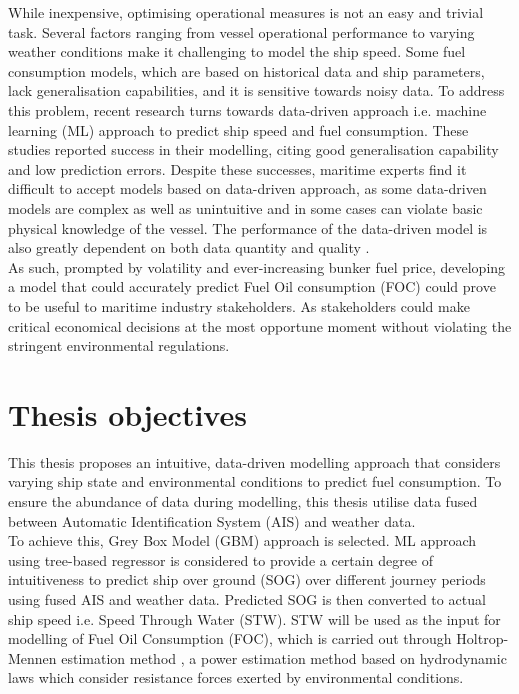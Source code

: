 While inexpensive, optimising operational measures is not an easy and trivial task. Several factors ranging from vessel operational performance to varying weather conditions make it challenging to model the ship speed. Some fuel consumption models, which are based on historical data and ship parameters, lack generalisation capabilities, and it is sensitive towards noisy data. To address this problem, recent research turns towards data-driven approach i.e. machine learning (ML) approach to predict ship speed and fuel consumption. These studies reported success in their modelling, citing good generalisation capability and low prediction errors. Despite these successes, maritime experts find it difficult to accept models based on data-driven approach, as some data-driven models are complex as well as unintuitive and in some cases can violate basic physical knowledge of the vessel. The performance of the data-driven model is also greatly dependent on both data quantity and quality .\\      

As such, prompted by volatility and ever-increasing bunker fuel price, developing a model that could accurately predict Fuel Oil consumption (FOC) could prove to be useful to maritime industry stakeholders. As stakeholders could make critical economical decisions at the most opportune moment without violating the stringent environmental regulations. \\

\section{Thesis objectives}\label{sec:objectives}

This thesis proposes an intuitive, data-driven modelling approach that considers varying ship state and environmental conditions to predict fuel consumption. To ensure the abundance of data during modelling, this thesis utilise data fused between Automatic Identification System (AIS) and weather data.\\

To achieve this, Grey Box Model (GBM) approach is selected. ML approach using tree-based regressor is considered to provide a certain degree of intuitiveness to predict ship over ground (SOG) over different journey periods using fused AIS and weather data. Predicted SOG is then converted to actual ship speed i.e. Speed Through Water (STW). STW will be used as the input for modelling of Fuel Oil Consumption (FOC), which is carried out through Holtrop-Mennen estimation method , a power estimation method based on hydrodynamic laws which consider resistance forces exerted by environmental conditions.\\


